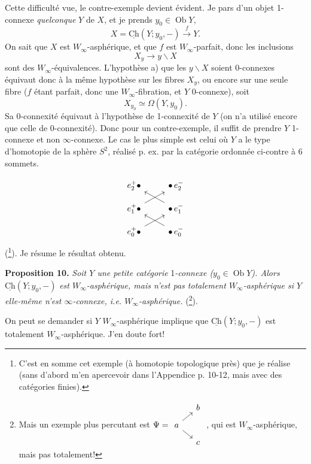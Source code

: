 \documentclass[11pt]{article}
\newcommand{\printedpage}[1]{\marginpar{\footnotesize p.~#1}}
\newcommand{\msp}[1]{\marginpar{\footnotesize [#1]}}
\newcommand{\uCh}{\underline{\mathrm{Ch}}}
\newcommand{\Ob}{\operatorname{Ob}}
\begin{document}
Cette difficulté vue, le contre-exemple devient évident. Je pars d'un objet 1-connexe \textit{quelconque} $Y$ de $X$, et je prends $y_0 \in \Ob Y$,
\[
X = \uCh(Y; y_0, -) \xrightarrow{\ f\ } Y.
\]
On sait que $X$ est $W_\infty$-asphérique, et que $f$ est $W_\infty$-parfait, donc les inclusions
\[
X_y \longrightarrow y\backslash X
\]
sont des $W_\infty$-équivalences. L'hypothèse a) que les $y\backslash X$ soient 0-connexes équivaut donc à la même hypothèse sur les fibres $X_y$, ou
\msp{page 103}
encore sur une seule fibre ($f$ étant parfait, donc une $W_\infty$-fibration, et $Y$ 0-connexe), soit
\[
X_{y_0} \simeq \Omega(Y, y_0).
\]
Sa 0-connexité équivaut à l'hypothèse de 1-connexité de $Y$ (on n'a utilisé encore que celle de 0-connexité). Donc pour un contre-exemple, il suffit de prendre $Y$ 1-connexe et non $\infty$-connexe. Le cas le plus simple est celui où $Y$ a le type d'homotopie de la sphère $S^2$, réalisé p. ex. par la catégorie ordonnée ci-contre à 6 sommets.

\printedpage{72}
\[
\begin{tikzcd}[row sep=small]
e_2^+ \bullet & \bullet\, e_2^- \\
e_1^+ \bullet \arrow[ur] & \bullet\, e_1^- \arrow[ul] \\
e_0^+ \bullet \arrow[ur] & \bullet\, e_0^- \arrow[ul]
\end{tikzcd}
\]
 (\footnote{C'est en somme cet exemple (à homotopie topologique près) que je réalise (sans d'abord m'en apercevoir dans l'Appendice p. 10-12, mais avec des catégories finies).}). Je résume le résultat obtenu.

\textbf{Proposition 10.} \textit{Soit $Y$ une petite catégorie} 1\textit{-connexe ($y_0 \in \Ob Y$). Alors} $\uCh(Y; y_0, -)$ \textit{est $W_\infty$-asphérique, mais n'est pas totalement $W_\infty$-asphérique si $Y$ elle-même n'est $\infty$-connexe, i.e. $W_\infty$-asphérique.} (\footnote{Mais un exemple plus percutant est $\Psi = \begin{tikzcd}[ampersand replacement=\&, row sep=small, column sep=small, baseline=(A.base)]
 \& b \\
|[alias=A]| a \arrow[ur] \arrow[dr] \& \\
 \& c
\end{tikzcd}$ , qui est $W_\infty$-asphérique, mais pas totalement!}).

On peut se demander si $Y$ $W_\infty$-asphérique implique que $\uCh(Y; y_0, -)$ est totalement $W_\infty$-asphérique. J'en doute fort!
\end{document}
